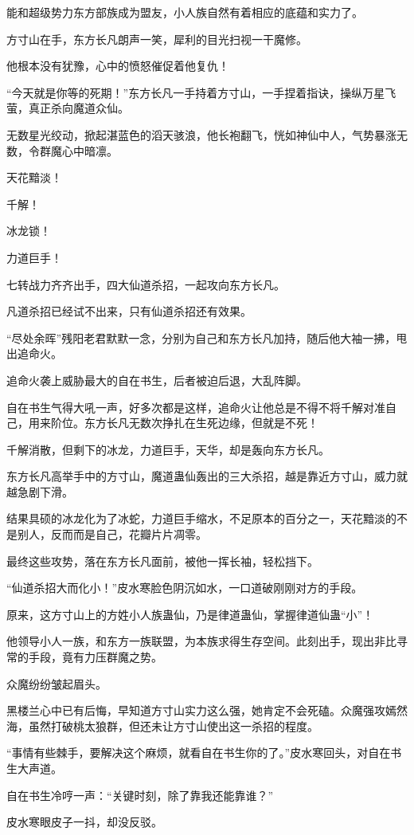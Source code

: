 \begin{this_body}
能和超级势力东方部族成为盟友，小人族自然有着相应的底蕴和实力了。

方寸山在手，东方长凡朗声一笑，犀利的目光扫视一干魔修。

他根本没有犹豫，心中的愤怒催促着他复仇！

“今天就是你等的死期！”东方长凡一手持着方寸山，一手捏着指诀，操纵万星飞萤，真正杀向魔道众仙。

无数星光绞动，掀起湛蓝色的滔天骇浪，他长袍翻飞，恍如神仙中人，气势暴涨无数，令群魔心中暗凛。

天花黯淡！

千解！

冰龙锁！

力道巨手！

七转战力齐齐出手，四大仙道杀招，一起攻向东方长凡。

凡道杀招已经试不出来，只有仙道杀招还有效果。

“尽处余晖”残阳老君默默一念，分别为自己和东方长凡加持，随后他大袖一拂，甩出追命火。

追命火袭上威胁最大的自在书生，后者被迫后退，大乱阵脚。

自在书生气得大吼一声，好多次都是这样，追命火让他总是不得不将千解对准自己，用来阶位。东方长凡无数次挣扎在生死边缘，但就是不死！

千解消散，但剩下的冰龙，力道巨手，天华，却是轰向东方长凡。

东方长凡高举手中的方寸山，魔道蛊仙轰出的三大杀招，越是靠近方寸山，威力就越急剧下滑。

结果具硕的冰龙化为了冰蛇，力道巨手缩水，不足原本的百分之一，天花黯淡的不是别人，反而而是自己，花瓣片片凋零。

最终这些攻势，落在东方长凡面前，被他一挥长袖，轻松挡下。

“仙道杀招大而化小！”皮水寒脸色阴沉如水，一口道破刚刚对方的手段。

原来，这方寸山上的方姓小人族蛊仙，乃是律道蛊仙，掌握律道仙蛊“小”！

他领导小人一族，和东方一族联盟，为本族求得生存空间。此刻出手，现出非比寻常的手段，竟有力压群魔之势。

众魔纷纷皱起眉头。

黑楼兰心中已有后悔，早知道方寸山实力这么强，她肯定不会死磕。众魔强攻嫣然海，虽然打破桃太狼群，但还未让方寸山使出这一杀招的程度。

“事情有些棘手，要解决这个麻烦，就看自在书生你的了。”皮水寒回头，对自在书生大声道。

自在书生冷哼一声：“关键时刻，除了靠我还能靠谁？”

皮水寒眼皮子一抖，却没反驳。


\end{this_body}
